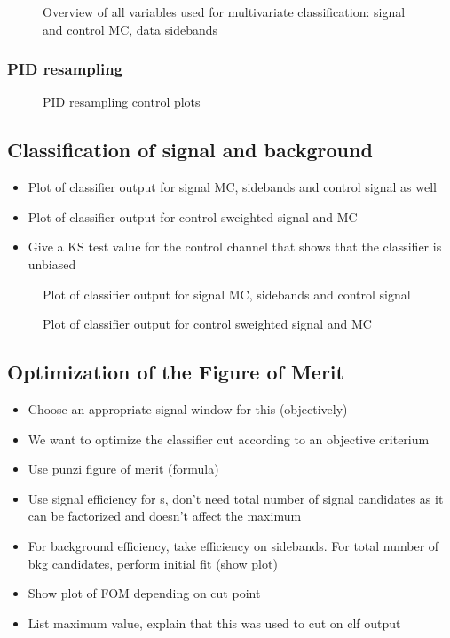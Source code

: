 \begin{figure}
  \centering
  \missingfigure[figwidth=\textwidth]{}
  \caption{Overview of all variables used for multivariate classification: signal and control MC, data sidebands}
\end{figure}

\subsubsection{PID resampling}

\begin{figure}
  \centering
  \missingfigure[figwidth=\textwidth]{}
  \caption{PID resampling control plots}
\end{figure}

\subsection{Classification of signal and background}

\begin{itemize}
  \item Plot of classifier output for signal MC, sidebands and control signal as well
  \item Plot of classifier output for control sweighted signal and MC
  \item Give a KS test value for the control channel that shows that the classifier is unbiased
\end{itemize}

\begin{figure}
  \centering
  \missingfigure[figwidth=\textwidth]{}
  \caption{Plot of classifier output for signal MC, sidebands and control signal}
\end{figure}

\begin{figure}
  \centering
  \missingfigure[figwidth=\textwidth]{}
  \caption{Plot of classifier output for control sweighted signal and MC}
\end{figure}

\subsection{Optimization of the Figure of Merit}

\begin{itemize}
  \item Choose an appropriate signal window for this (objectively)
  \item We want to optimize the classifier cut according to an objective criterium
  \item Use punzi figure of merit (formula)
  \item Use signal efficiency for s, don't need total number of signal candidates as it can be factorized and doesn't affect the maximum
  \item For background efficiency, take efficiency on sidebands. For total number of bkg candidates, perform initial fit (show plot)
  \item Show plot of FOM depending on cut point
  \item List maximum value, explain that this was used to cut on clf output
\end{itemize}

